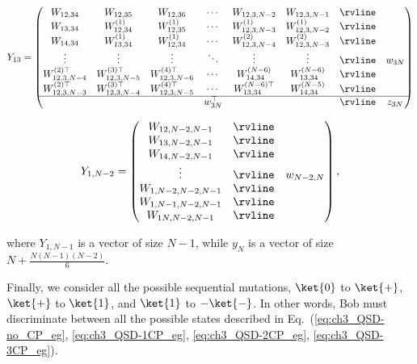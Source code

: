 \begin{appendices}
\begin{align}
    \label{eq:ch3_QSD-Y_13}
    Y_{13} =
    \begin{pmatrix}
        W_{12,34} & W_{12,35} & W_{12,36} & \cdots & W_{12,3,N-2} & W_{12,3,N-1} & \rvline &  \\
        W_{13,34} & W_{12,34}^{(1)} & W_{12,35}^{(1)} & \cdots & W_{12,3,N-3}^{(1)} & W_{12,3,N-2}^{(1)} & \rvline &  \\
        W_{14,34} & W_{13,34}^{(1)} & W_{12,34}^{(1)} & \cdots & W_{12,3,N-4}^{(2)} & W_{12,3,N-3}^{(2)} & \rvline &  \\
        \vdots & \vdots & \vdots & \ddots & \vdots & \vdots & \rvline & w_{3N} \\
        W_{12,3,N-4}^{(2)\top} & W_{12,3,N-5}^{(3)\top} & W_{12,3,N-6}^{(4)\top} & \cdots & W_{14,34}^{(N-6)} & W_{13,34}^{(N-6)} & \rvline &  \\
        W_{12,3,N-3}^{(2)\top} & W_{12,3,N-4}^{(3)\top} & W_{12,3,N-5}^{(4)\top} & \cdots & W_{13,34}^{(N-6)\top} & W_{14,34}^{(N-5)} & \rvline &  \\
        \hline
         &  &  & w_{3N}^\top &  &  & \rvline & z_{3N}
    \end{pmatrix}
\end{align}

\begin{align}
    \label{eq:ch3_QSD-Y_1N_2}
    Y_{1,N-2} =
    \begin{pmatrix}
        W_{12,N-2,N-1} & \rvline &  \\
        W_{13,N-2,N-1} & \rvline &  \\
        W_{14,N-2,N-1} & \rvline &  \\
        \vdots & \rvline & w_{N-2,N} \\
        W_{1,N-2,N-2,N-1} & \rvline &  \\
        W_{1,N-1,N-2,N-1} & \rvline &  \\
        W_{1N,N-2,N-1} & \rvline &  \\
    \end{pmatrix},
\end{align}

where $Y_{1,N-1}$ is a vector of size $N-1$, while $y_N$ is a vector of size $N + \frac{N (N-1) (N-2)}{6}$.

Finally, we consider all the possible sequential mutations, $\ket{0}$ to $\ket{+}$, $\ket{+}$ to $\ket{1}$, and $\ket{1}$ to $-\ket{-}$.
In other words, Bob must discriminate between all the possible states described in Eq.~(\eqref{eq:ch3_QSD-no_CP_eg}, \eqref{eq:ch3_QSD-1CP_eg}, \eqref{eq:ch3_QSD-2CP_eg}, \ref{eq:ch3_QSD-3CP_eg}).


\end{appendices}
